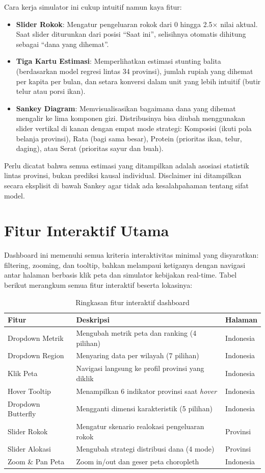 Cara kerja simulator ini cukup intuitif namun kaya fitur:
\begin{itemize}
  \item \textbf{Slider Rokok}: Mengatur pengeluaran rokok dari 0 hingga 2.5$\times$ nilai aktual. Saat slider diturunkan dari posisi ``Saat ini'', selisihnya otomatis dihitung sebagai ``dana yang dihemat''.
  \item \textbf{Tiga Kartu Estimasi}: Memperlihatkan estimasi stunting balita (berdasarkan model regresi lintas 34 provinsi), jumlah rupiah yang dihemat per kapita per bulan, dan setara konversi dalam unit yang lebih intuitif (butir telur atau porsi ikan).
  \item \textbf{Sankey Diagram}: Memvisualisasikan bagaimana dana yang dihemat mengalir ke lima komponen gizi. Distribusinya bisa diubah menggunakan slider vertikal di kanan dengan empat mode strategi: Komposisi (ikuti pola belanja provinsi), Rata (bagi sama besar), Protein (prioritas ikan, telur, daging), atau Serat (prioritas sayur dan buah).
\end{itemize}

Perlu dicatat bahwa semua estimasi yang ditampilkan adalah asosiasi statistik lintas provinsi, bukan prediksi kausal individual. Disclaimer ini ditampilkan secara eksplisit di bawah Sankey agar tidak ada kesalahpahaman tentang sifat model.

\section{Fitur Interaktif Utama}

Dashboard ini memenuhi semua kriteria interaktivitas minimal yang disyaratkan: filtering, zooming, dan tooltip, bahkan melampaui ketiganya dengan navigasi antar halaman berbasis klik peta dan simulator kebijakan real-time. Tabel berikut merangkum semua fitur interaktif beserta lokasinya:

\begin{table}[H]
\centering
\caption{Ringkasan fitur interaktif dashboard}
\renewcommand{\arraystretch}{1.3}
\begin{tabularx}{\textwidth}{@{}lXl@{}}
\toprule
\textbf{Fitur} & \textbf{Deskripsi} & \textbf{Halaman} \\
\midrule
Dropdown Metrik & Mengubah metrik peta dan ranking (4 pilihan) & Indonesia \\
Dropdown Region & Menyaring data per wilayah (7 pilihan) & Indonesia \\
Klik Peta & Navigasi langsung ke profil provinsi yang diklik & Indonesia \\
Hover Tooltip & Menampilkan 6 indikator provinsi saat \textit{hover} & Indonesia \\
Dropdown Butterfly & Mengganti dimensi karakteristik (5 pilihan) & Indonesia \\
Slider Rokok & Mengatur skenario realokasi pengeluaran rokok & Provinsi \\
Slider Alokasi & Mengubah strategi distribusi dana (4 mode) & Provinsi \\
Zoom \& Pan Peta & Zoom in/out dan geser peta choropleth & Indonesia \\
\bottomrule
\end{tabularx}
\end{table}
